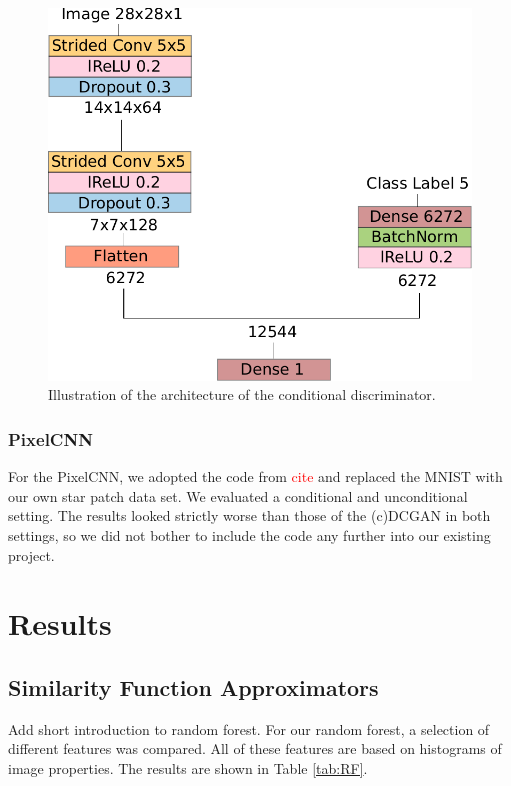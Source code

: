 \documentclass[10pt,conference,compsocconf]{IEEEtran}
\newcommand\TODO[1]{\textcolor{red}{#1}} %
\begin{document}
\begin{figure}
    \centering
    \includegraphics[width=0.75\columnwidth]{assets/cdis_arch.pdf}
    \caption{Illustration of the architecture of the conditional discriminator.}
    \label{fig:cdis_arch}
\end{figure}





\subsubsection{PixelCNN}
For the PixelCNN, we adopted the code from \TODO{cite} and replaced the MNIST with our own star patch data set. We evaluated a conditional and unconditional setting. The results looked strictly worse than those of the (c)DCGAN in both settings, so we did not bother to include the code any further into our existing project.



\section{Results}
\label{sec:results}
\subsection{Similarity Function Approximators}
Add short introduction to random forest.
For our random forest, a selection of different features was compared. All of these features are based on histograms of image properties. The results are shown in Table \ref{tab:RF}. \\

    
\end{document}
